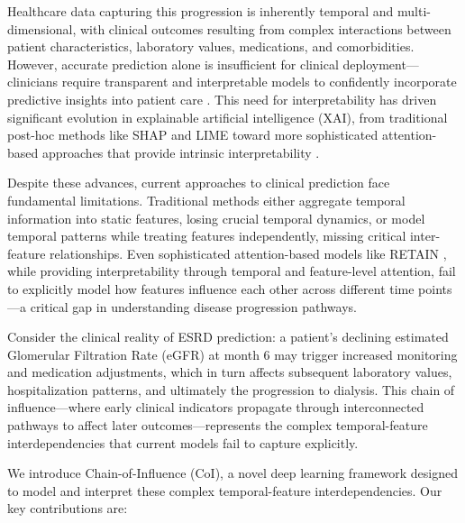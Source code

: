 \documentclass[letterpaper]{article}
\begin{document}
Healthcare data capturing this progression is inherently temporal and multi-dimensional, with clinical outcomes resulting from complex interactions between patient characteristics, laboratory values, medications, and comorbidities. However, accurate prediction alone is insufficient for clinical deployment—clinicians require transparent and interpretable models to confidently incorporate predictive insights into patient care \cite{caruana2015intelligible, rudin2019stop, tonekaboni2019clinicians}. This need for interpretability has driven significant evolution in explainable artificial intelligence (XAI), from traditional post-hoc methods like SHAP \cite{lundberg2017unified} and LIME \cite{ribeiro2016should} toward more sophisticated attention-based approaches that provide intrinsic interpretability \cite{choi2016retain, choi2017gram, bardhan2024icu}.

Despite these advances, current approaches to clinical prediction face fundamental limitations. Traditional methods either aggregate temporal information into static features, losing crucial temporal dynamics, or model temporal patterns while treating features independently, missing critical inter-feature relationships. Even sophisticated attention-based models like RETAIN \cite{choi2016retain}, while providing interpretability through temporal and feature-level attention, fail to explicitly model how features influence each other across different time points—a critical gap in understanding disease progression pathways.

Consider the clinical reality of ESRD prediction: a patient's declining estimated Glomerular Filtration Rate (eGFR) at month 6 may trigger increased monitoring and medication adjustments, which in turn affects subsequent laboratory values, hospitalization patterns, and ultimately the progression to dialysis. This chain of influence—where early clinical indicators propagate through interconnected pathways to affect later outcomes—represents the complex temporal-feature interdependencies that current models fail to capture explicitly.

We introduce Chain-of-Influence (CoI), a novel deep learning framework designed to model and interpret these complex temporal-feature interdependencies. Our key contributions are:
\end{document}
